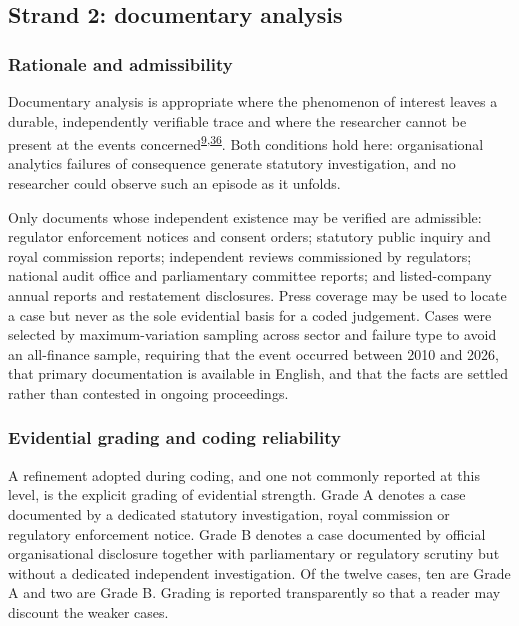 \documentclass[11pt,a4paper]{article}
\numberwithin{figure}{section}
\numberwithin{table}{section}
\begin{document}
\subsection{Strand 2: documentary analysis}

\subsubsection{Rationale and admissibility}

Documentary analysis is appropriate where the phenomenon of interest leaves a durable, independently
verifiable trace and where the researcher cannot be present at the events
concerned\textsuperscript{\hyperlink{ref9}{9},\hyperlink{ref36}{36}}. Both conditions hold here: organisational analytics failures of
consequence generate statutory investigation, and no researcher could observe such an episode as it
unfolds.

Only documents whose independent existence may be verified are admissible: regulator enforcement notices
and consent orders; statutory public inquiry and royal commission reports; independent reviews commissioned
by regulators; national audit office and parliamentary committee reports; and listed-company annual reports
and restatement disclosures. Press coverage may be used to locate a case but never as the sole evidential
basis for a coded judgement. Cases were selected by maximum-variation sampling across sector and failure
type to avoid an all-finance sample, requiring that the event occurred between 2010 and 2026, that primary
documentation is available in English, and that the facts are settled rather than contested in ongoing
proceedings.

\subsubsection{Evidential grading and coding reliability}

A refinement adopted during coding, and one not commonly reported at this level, is the explicit grading of
evidential strength. Grade A denotes a case documented by a dedicated statutory investigation, royal
commission or regulatory enforcement notice. Grade B denotes a case documented by official organisational
disclosure together with parliamentary or regulatory scrutiny but without a dedicated independent
investigation. Of the twelve cases, ten are Grade A and two are Grade B. Grading is reported transparently
so that a reader may discount the weaker cases.
\end{document}
